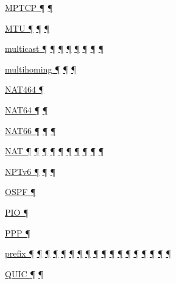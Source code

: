 \documentclass[
]{article}
\begin{document}
\hyperref[transport-protocols]{MPTCP ¶} \hyperref[multihoming]{¶}

\hyperref[extension-headers-and-options]{MTU ¶}
\hyperref[layer-2-functions]{¶} \hyperref[packet-format]{¶}

\hyperref[address-resolution]{multicast ¶} \hyperref[addresses]{¶}
\hyperref[auto-configuration]{¶} \hyperref[layer-2-functions]{¶}
\hyperref[ipv6-primary-differences-from-ipv4]{¶} \hyperref[filtering]{¶}
\hyperref[layer-2-considerations]{¶} \hyperref[energy-consumption]{¶}

\hyperref[multi-prefix-operation]{multihoming ¶}
\hyperref[multihoming]{¶} \hyperref[deployment-in-the-enterprise]{¶}

\hyperref[translation-and-ipv4-as-a-service]{NAT464 ¶}

\hyperref[dual-stack-scenarios]{NAT64 ¶}
\hyperref[translation-and-ipv4-as-a-service]{¶}

\hyperref[ipv6-primary-differences-from-ipv4]{NAT66 ¶}
\hyperref[translation-and-ipv4-as-a-service]{¶} \hyperref[security]{¶}

\hyperref[transport-protocols]{NAT ¶} \hyperref[dual-stack-scenarios]{¶}
\hyperref[obsolete-techniques]{¶}
\hyperref[translation-and-ipv4-as-a-service]{¶} \hyperref[tunnels]{¶}
\hyperref[security]{¶} \hyperref[topology-obfuscation]{¶}
\hyperref[address-planning]{¶} \hyperref[multihoming]{¶}
\hyperref[deployment-in-the-enterprise]{¶}

\hyperref[translation-and-ipv4-as-a-service]{NPTv6 ¶}
\hyperref[security]{¶} \hyperref[multihoming]{¶}

\hyperref[routing]{OSPF ¶}

\hyperref[auto-configuration]{PIO ¶}

\hyperref[layer-2-functions]{PPP ¶}

\hyperref[addresses]{prefix ¶} \hyperref[auto-configuration]{¶}
\hyperref[managed-configuration]{¶} \hyperref[routing]{¶}
\hyperref[source-and-destination-address-selection]{¶}
\hyperref[dual-stack-scenarios]{¶}
\hyperref[ipv6-primary-differences-from-ipv4]{¶}
\hyperref[translation-and-ipv4-as-a-service]{¶} \hyperref[tunnels]{¶}
\hyperref[security]{¶} \hyperref[filtering]{¶}
\hyperref[layer-2-considerations]{¶} \hyperref[topology-obfuscation]{¶}
\hyperref[network-design]{¶} \hyperref[address-planning]{¶}
\hyperref[address-and-prefix-management]{¶}
\hyperref[multi-prefix-operation]{¶} \hyperref[multihoming]{¶}

\hyperref[transport-protocols]{QUIC ¶} \hyperref[multihoming]{¶}
\end{document}
